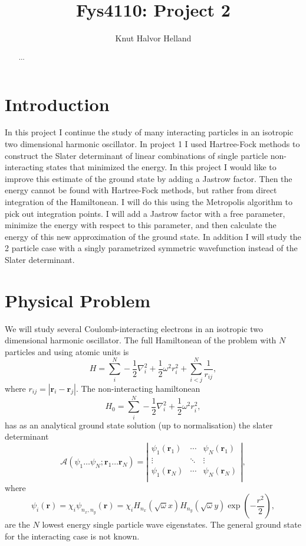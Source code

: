 \documentclass[a4paper,English,10pt]{article}
\title{Fys4110: Project 2}
\author{Knut Halvor Helland}
\newcommand{\bb}[1]{\boldsymbol{#1}}
\newcommand{\be}{\begin{equation}}
\newcommand{\ee}{\end{equation}}
\newcommand{\f}{\frac}
\begin{document}
\maketitle{}
\begin{abstract}
$\ldots$
\end{abstract}


\section{Introduction}
In this project I continue the study of many interacting particles in an isotropic two dimensional harmonic oscillator.
In project 1 \cite{proj1} I used Hartree-Fock methods to construct the Slater determinant of linear combinations of single
particle non-interacting states that minimized the energy. In this project I would like to improve this estimate of the ground state
by adding a Jastrow factor. Then the energy cannot be found with Hartree-Fock methods, but rather from direct integration of the Hamiltonean.
I will do this using the Metropolis algorithm to pick out integration points.
I will add a Jastrow factor with a free parameter, minimize the energy with respect to this parameter, and
then calculate the energy of this new approximation of the ground state.
In addition I will study the 2 particle case with a singly parametrized symmetric wavefunction instead of the Slater determinant.


\section{Physical Problem}
We will study several Coulomb-interacting electrons in an isotropic two dimensional harmonic oscillator.
The full Hamiltonean of the problem with $N$ particles and using atomic units is
\be
H = \sum_i^N -\f{1}{2}\nabla^2_i + \f{1}{2}\omega^2r^2_i + \sum_{i<j}^N\f{1}{r_{ij}}, \label{ham}
\ee
where $r_{ij} = |\bb{r}_i-\bb{r}_j|$.
The non-interacting hamiltonean
\be
H_0 = \sum_i^N -\f{1}{2}\nabla^2_i + \f{1}{2}\omega^2r^2_i,\label{ham0}
\ee
has as an analytical ground state solution (up to normalisation) the slater determinant
\be
\mathcal{A}\left(\psi_1\ldots\psi_N;\bb{r}_1\ldots\bb{r}_N\right) =
\left|\begin{matrix}
  \psi_1(\bb{r}_1)&\cdots&\psi_N(\bb{r}_1)\\
  \vdots&\ddots&\vdots\\
  \psi_1(\bb{r}_N)&\cdots&\psi_N(\bb{r}_N)\\
  \end{matrix}\right|,
\ee
where
\be
\psi_i(\bb{r}) = \chi_i\psi_{n_x,n_y}(\bb{r}) = \chi_iH_{n_x}(\sqrt{\omega}x)H_{n_y}(\sqrt{\omega}y)\exp(-\f{r^2}{2}),\label{spwf}
\ee
are the $N$ lowest energy single particle wave eigenstates.
The general ground state for the interacting case is not known.
\end{document}
